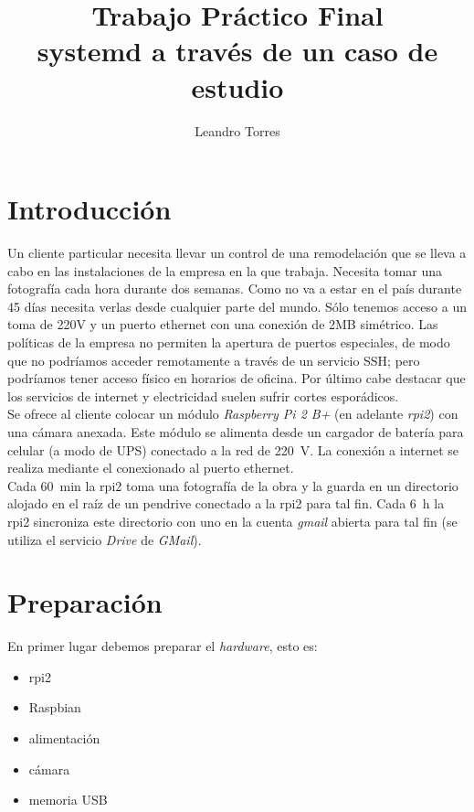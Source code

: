 \documentclass[10pt,a4paper]{article}
\author{Leandro Torres}
\title{\Huge{Trabajo Pr\'actico Final}\\
	\vspace{5cm}
	\huge{systemd a trav\'es de un caso de estudio}}
\begin{document}
\maketitle
\pagebreak
\tableofcontents

\section{Introducci\'on}

Un cliente particular necesita llevar un control de una remodelaci\'on que se lleva a cabo en las instalaciones de la empresa en la que trabaja. Necesita tomar una fotograf\'ia cada hora durante dos semanas. Como no va a estar en el pa\'is durante 45 d\'ias necesita verlas desde cualquier parte del mundo. S\'olo tenemos acceso a un toma de 220V y un puerto ethernet con una conexi\'on de 2MB sim\'etrico. Las pol\'iticas de la empresa no permiten la apertura de puertos especiales, de modo que no podr\'iamos acceder remotamente a trav\'es de un servicio SSH; pero podr\'iamos tener acceso f\'isico en horarios de oficina. Por \'ultimo cabe destacar que los servicios de internet y electricidad suelen sufrir cortes espor\'adicos.\\

Se ofrece al cliente colocar un m\'odulo \emph{Raspberry Pi 2 B+} (en adelante \emph{rpi2}) con una c\'amara anexada. Este m\'odulo se alimenta desde un cargador de bater\'ia para celular (a modo de UPS) conectado a la red de \SI{220}{V}. La conexi\'on a internet se realiza mediante el conexionado al puerto ethernet.\\

Cada \SI{60}{min} la rpi2 toma una fotograf\'ia de la obra y la guarda en un directorio alojado en el ra\'iz de un pendrive conectado a la rpi2 para tal fin. Cada \SI{6}{h} la rpi2 sincroniza este directorio con uno en la cuenta \emph{gmail} abierta para tal fin (se utiliza el servicio \emph{Drive} de \emph{GMail}).

\section{Preparaci\'on}

En primer lugar debemos preparar el \emph{hardware}, esto es:
\begin{itemize}
    \item rpi2
    \item Raspbian
    \item alimentaci\'on
    \item c\'amara
    \item memoria USB
\end{itemize}
\end{document}
